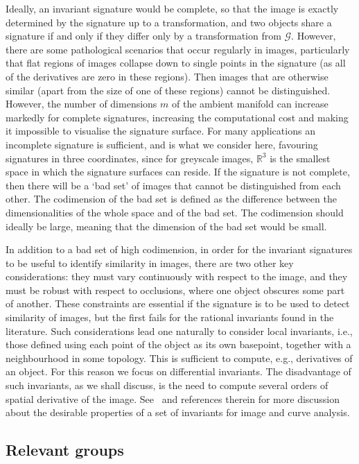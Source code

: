 \documentclass[review,onefignum,onetabnum]{siamonline190516}
\begin{document}
Ideally, an invariant signature would be complete, so that the image is exactly determined by the signature up to a transformation, and two objects share a signature if and only if they differ only by a transformation from $\mathcal{G}$. However, there are some pathological scenarios that occur regularly in images, particularly that flat regions of images collapse down to single points in the signature (as all of the derivatives are zero in these regions). Then images that are otherwise similar (apart from the size of one of these regions) cannot be distinguished. However, the number of dimensions $m$ of the ambient manifold can increase markedly for complete signatures, increasing the computational cost and making it impossible to visualise the signature surface. For many applications an incomplete signature is sufficient, and is what we consider here, favouring signatures in three coordinates, since for greyscale images, $\mathbb{R}^3$ is the smallest space in which the signature surfaces can reside.  If the signature is not complete, then there will be a `bad set' of images that cannot be distinguished from each other.  The codimension of the bad set is defined as the difference between the dimensionalities of the whole space and of the bad set. The codimension should ideally be large, meaning that the dimension of the bad set would be small. 

In addition to a bad set of high codimension, in order for the invariant signatures to be useful to identify similarity in images, there are two other key considerations: they must vary continuously with respect to the image, and they must be robust with respect to occlusions, where one object obscures some part of another. These constraints are essential if the signature is to be used to detect similarity of images, but the first fails for the rational invariants found in the literature. Such considerations lead one naturally to consider local invariants, i.e., those defined using each point of the object as its own basepoint, together with a neighbourhood in some topology. This is sufficient to compute, e.g., derivatives of an object. For this reason we focus on differential invariants. The disadvantage of such invariants, as we shall discuss, is the need to compute several orders of spatial derivative of the image. See~\citet{UsMobius} and references therein for more discussion about the desirable properties of a set of invariants for image and curve analysis. 

\subsection{Relevant groups}
\end{document}
